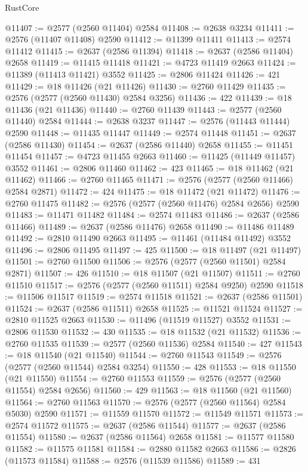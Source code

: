 \begin{lexlean}{RustCore}
\begin{coremodule}
@11407 := @2577 (@2560 @11404) @2584
@11408 := @2638 @3234
@11411 := @2576 (@11407 @11408) @2590
@11412 := @11399 @11411
@11413 := @2574 @11412
@11415 := @2637 (@2586 @11394)
@11418 := @2637 (@2586 @11404) @2658
@11419 := @11415 @11418
@11421 := @4723 @11419 @2663
@11424 := @11389 (@11413 @11421) @3552
@11425 := @2806 @11424
@11426 := 421
@11429 := @18 @11426 (@21 @11426)
@11430 := @2760 @11429
@11435 := @2576 (@2577 (@2560 @11430) @2584 @3256)
@11436 := 422
@11439 := @18 @11436 (@21 @11436)
@11440 := @2760 @11439
@11443 := @2577 (@2560 @11440) @2584
@11444 := @2638 @3237
@11447 := @2576 (@11443 @11444) @2590
@11448 := @11435 @11447
@11449 := @2574 @11448
@11451 := @2637 (@2586 @11430)
@11454 := @2637 (@2586 @11440) @2658
@11455 := @11451 @11454
@11457 := @4723 @11455 @2663
@11460 := @11425 (@11449 @11457) @3552
@11461 := @2806 @11460
@11462 := 423
@11465 := @18 @11462 (@21 @11462)
@11466 := @2760 @11465
@11471 := @2576 (@2577 (@2560 @11466) @2584 @2871)
@11472 := 424
@11475 := @18 @11472 (@21 @11472)
@11476 := @2760 @11475
@11482 := @2576 (@2577 (@2560 @11476) @2584 @2656) @2590
@11483 := @11471 @11482
@11484 := @2574 @11483
@11486 := @2637 (@2586 @11466)
@11489 := @2637 (@2586 @11476) @2658
@11490 := @11486 @11489
@11492 := @2810 @11490 @2663
@11495 := @11461 (@11484 @11492) @3552
@11496 := @2806 @11495
@11497 := 425
@11500 := @18 @11497 (@21 @11497)
@11501 := @2760 @11500
@11506 := @2576 (@2577 (@2560 @11501) @2584 @2871)
@11507 := 426
@11510 := @18 @11507 (@21 @11507)
@11511 := @2760 @11510
@11517 := @2576 (@2577 (@2560 @11511) @2584 @9250) @2590
@11518 := @11506 @11517
@11519 := @2574 @11518
@11521 := @2637 (@2586 @11501)
@11524 := @2637 (@2586 @11511) @2658
@11525 := @11521 @11524
@11527 := @2810 @11525 @2663
@11530 := @11496 (@11519 @11527) @3552
@11531 := @2806 @11530
@11532 := 430
@11535 := @18 @11532 (@21 @11532)
@11536 := @2760 @11535
@11539 := @2577 (@2560 @11536) @2584
@11540 := 427
@11543 := @18 @11540 (@21 @11540)
@11544 := @2760 @11543
@11549 := @2576 (@2577 (@2560 @11544) @2584 @3254)
@11550 := 428
@11553 := @18 @11550 (@21 @11550)
@11554 := @2760 @11553
@11559 := @2576 (@2577 (@2560 @11554) @2584 @2656)
@11560 := 429
@11563 := @18 @11560 (@21 @11560)
@11564 := @2760 @11563
@11570 := @2576 (@2577 (@2560 @11564) @2584 @5030) @2590
@11571 := @11559 @11570
@11572 := @11549 @11571
@11573 := @2574 @11572
@11575 := @2637 (@2586 @11544)
@11577 := @2637 (@2586 @11554)
@11580 := @2637 (@2586 @11564) @2658
@11581 := @11577 @11580
@11582 := @11575 @11581
@11584 := @2880 @11582 @2663
@11586 := @2826 (@11573 @11584)
@11588 := @2576 (@11539 @11586)
@11589 := 431

\end{coremodule}
\end{lexlean}
